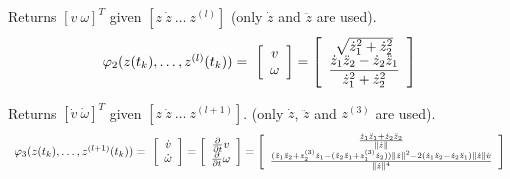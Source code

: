 \documentclass[letterpaper,10pt,english]{sphinxmanual}
\begin{document}
\begin{fulllineitems}
\begin{fulllineitems}
\label{Multi-robot motion planner:planning_sim.UnicycleKineModel.phi_2}
Returns \([v\ \omega]^T\) given \([z\ \dot{z}\ \dotsc\ z^{(l)}]\)
(only \(\dot{z}\) and \(\ddot{z}\) are used).
\begin{gather}
\begin{split}\begin{array}{l}
\varphi_2(z(t_k),\dotsc,z^{(l)}(t_k))=\
\left[\begin{array}{c}
v\\
\omega
\end{array}\right]
= \left[\begin{array}{c}
\sqrt{\dot{z}_{1}^{2} + \dot{z}_{2}^{2}}\\
\dfrac{\dot{z}_{1}\ddot{z}_{2} -
\dot{z}_{2}\ddot{z}_{1}}{\dot{z}_{1}^{2}+\dot{z}_{2}^{2}}
\end{array}\right]
\end{array}\end{split}\notag
\end{gather}
\end{fulllineitems}


\begin{fulllineitems}
\label{Multi-robot motion planner:planning_sim.UnicycleKineModel.phi_3}
Returns \([\dot{v}\ \dot{\omega}]^T\) given
\([z\ \dot{z}\ \dotsc\ z^{(l+1)}]\).
(only \(\dot{z}\), \(\ddot{z}\) and \(z^{(3)}\) are used).
\begin{gather}
\begin{split}\begin{array}{l}
\varphi_3(z(t_k),\dotsc,z^{(l+1)}(t_k))=\
\left[\begin{array}{c}
\dot{v}\\
\dot{\omega}
\end{array}\right]
= \left[\begin{array}{c}
\frac{\partial}{\partial t}v\\
\frac{\partial}{\partial t}\omega
\end{array}\right]
= \left[\begin{array}{c}
\frac{\dot{z}_1\ddot{z}_1 + \dot{z}_2\ddot{z}_2}{\|\dot{z}\|}\\
\frac{(\ddot{z}_1\ddot{z}_2+ z^{(3)}_2\dot{z}_1 -
(\ddot{z}_2\ddot{z}_1+z^{(3)}_1\dot{z}_2))\|\dot{z}\|^2-
2(\dot{z}_1\ddot{z}_2-\dot{z}_2\ddot{z}_1)\|\dot{z}\|\dot{v}}{\|\dot{z}\|^4}
\end{array}\right]
\end{array}\end{split}\notag
\end{gather}
\end{fulllineitems}


\end{fulllineitems}
\end{document}
